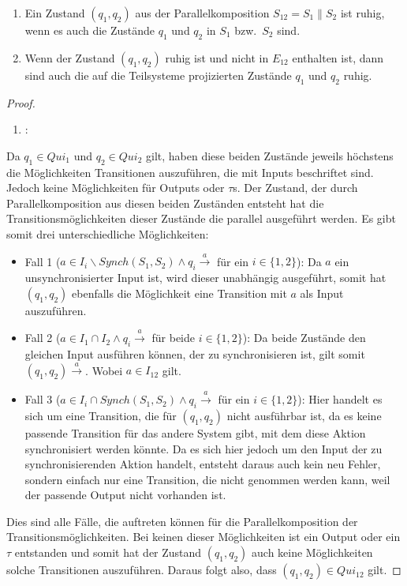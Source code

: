\begin{lem}
  \label{lemRuheParallelkomp}
  \begin{enumerate}
    \item Ein Zustand $(q_1,q_2)$ aus der Parallelkomposition $S_{12}=S_1\|S_2$
      ist ruhig, wenn es auch die Zustände $q_1$ und $q_2$ in $S_1$ bzw.\ $S_2$
      sind.
    \item Wenn der Zustand $(q_1,q_2)$ ruhig ist und nicht in $E_{12}$
      enthalten ist, dann sind auch die auf die Teilsysteme projizierten
      Zustände $q_1$ und $q_2$ ruhig.
  \end{enumerate}
\end{lem}

\begin{proof}
  ~
  \begin{enumerate}
    \item \hspace{-0.2cm}:
  \end{enumerate}
  \vspace{-0.3cm}
  Da $q_1\in Qui_1$ und $q_2\in Qui_2$ gilt, haben
  diese beiden Zustände jeweils höchstens die Möglichkeiten Transitionen
  auszuführen, die mit Inputs beschriftet sind. Jedoch keine Möglichkeiten für
  Outputs oder $\tau$s. Der Zustand, der durch Parallelkomposition aus diesen
  beiden Zuständen entsteht hat die Transitionsmöglichkeiten dieser Zustände
  die parallel ausgeführt werden. Es gibt somit drei unterschiedliche
  Möglichkeiten:
  \begin{itemize}
    \item Fall 1 ($a\in I_i\backslash Synch(S_1,S_2)\wedge q_i
      \overset{a}{\rightarrow}$ für ein $i\in \{1,2\}$): Da $a$ ein
      unsynchronisierter Input ist, wird dieser unabhängig ausgeführt, somit hat
      $(q_1,q_2)$ ebenfalls die Möglichkeit eine Transition mit $a$ als Input
      auszuführen.
    \item Fall 2 ($a\in I_1\cap I_2\wedge q_i \overset{a}{\rightarrow}$ für
      beide $i\in \{1,2\}$): Da beide Zustände den gleichen Input ausführen
      können, der zu synchronisieren ist, gilt somit $(q_1,q_2)
      \overset{a}{\rightarrow}$. Wobei $a\in I_{12}$ gilt.
    \item Fall 3 ($a\in I_i\cap Synch(S_1,S_2)\wedge q_i
      \overset{a}{\rightarrow}$ für ein $i\in \{1,2\}$): Hier handelt es sich
      um eine Transition, die für $(q_1,q_2)$ nicht ausführbar ist, da es keine
      passende Transition für das andere System gibt, mit dem diese Aktion
      synchronisiert werden könnte. Da es sich hier jedoch um den Input der zu
      synchronisierenden Aktion handelt, entsteht daraus auch kein
      neu Fehler, sondern einfach nur eine Transition, die nicht
      genommen werden kann, weil der passende Output nicht vorhanden ist.
  \end{itemize}
  Dies sind alle Fälle, die auftreten können für die Parallelkomposition der
  Transitionsmöglichkeiten. Bei keinen dieser Möglichkeiten ist ein Output oder
  ein $\tau$ entstanden und somit hat der Zustand $(q_1,q_2)$ auch keine
  Möglichkeiten solche Transitionen auszuführen. Daraus folgt also, dass
  $(q_1,q_2)\in Qui_{12}$ gilt.


\end{proof}
